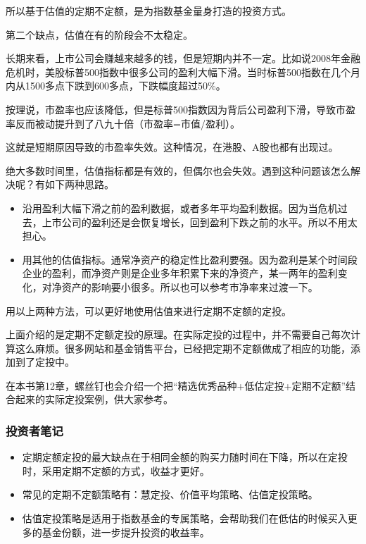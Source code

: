 所以基于估值的定期不定额，是为指数基金量身打造的投资方式。

第二个缺点，估值在有的阶段会不太稳定。

长期来看，上市公司会赚越来越多的钱，但是短期内并不一定。比如说2008年金融危机时，美股标普500指数中很多公司的盈利大幅下滑。当时标普500指数在几个月内从1500多点下跌到600多点，下跌幅度超过50\%。

按理说，市盈率也应该降低，但是标普500指数因为背后公司盈利下滑，导致市盈率反而被动提升到了八九十倍（市盈率=市值/盈利）。

这就是短期原因导致的市盈率失效。这种情况，在港股、A股也都有出现过。

绝大多数时间里，估值指标都是有效的，但偶尔也会失效。遇到这种问题该怎么解决呢？有如下两种思路。

\begin{itemize}
\item 沿用盈利大幅下滑之前的盈利数据，或者多年平均盈利数据。因为当危机过去，上市公司的盈利还是会恢复增长，回到盈利下跌之前的水平。所以不用太担心。
\item 用其他的估值指标。通常净资产的稳定性比盈利要强。因为盈利是某个时间段企业的盈利，而净资产则是企业多年积累下来的净资产，某一两年的盈利变化，对净资产的影响要小很多。所以也可以参考市净率来过渡一下。
\end{itemize}

用以上两种方法，可以更好地使用估值来进行定期不定额的定投。

上面介绍的是定期不定额定投的原理。在实际定投的过程中，并不需要自己每次计算这么麻烦。很多网站和基金销售平台，已经把定期不定额做成了相应的功能，添加到了定投中。

在本书第12章，螺丝钉也会介绍一个把“精选优秀品种+低估定投+定期不定额”结合起来的实际定投案例，供大家参考。

\subsubsection{投资者笔记}

\begin{itemize}
\item {\kaishu 定期定额定投的最大缺点在于相同金额的购买力随时间在下降，所以在定投时，采用定期不定额的方式，收益才更好。}
\item {\kaishu 常见的定期不定额策略有：慧定投、价值平均策略、估值定投策略。}
\item {\kaishu 估值定投策略是适用于指数基金的专属策略，会帮助我们在低估的时候买入更多的基金份额，进一步提升投资的收益率。}
\end{itemize}

